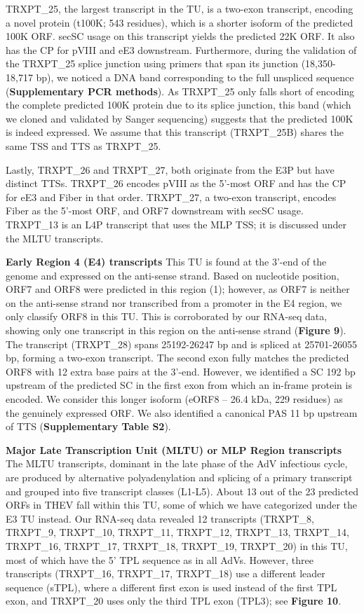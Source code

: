 \documentclass[
]{article}
\begin{document}
TRXPT\_25, the largest transcript in the TU, is a two-exon transcript,
encoding a novel protein (t100K; 543 residues), which is a shorter
isoform of the predicted 100K ORF. secSC usage on this transcript yields
the predicted 22K ORF. It also has the CP for pVIII and eE3 downstream.
Furthermore, during the validation of the TRXPT\_25 splice junction
using primers that span its junction (18,350-18,717 bp), we noticed a
DNA band corresponding to the full unspliced sequence
(\textbf{Supplementary PCR methods}). As TRXPT\_25 only falls short of
encoding the complete predicted 100K protein due to its splice junction,
this band (which we cloned and validated by Sanger sequencing) suggests
that the predicted 100K is indeed expressed. We assume that this
transcript (TRXPT\_25B) shares the same TSS and TTS as TRXPT\_25.

Lastly, TRXPT\_26 and TRXPT\_27, both originate from the E3P but have
distinct TTSs. TRXPT\_26 encodes pVIII as the 5'-most ORF and has the CP
for eE3 and Fiber in that order. TRXPT\_27, a two-exon transcript,
encodes Fiber as the 5'-most ORF, and ORF7 downstream with secSC usage.
TRXPT\_13 is an L4P transcript that uses the MLP TSS; it is discussed
under the MLTU transcripts.

\textbf{Early Region 4 (E4) transcripts} This TU is found at the 3'-end
of the genome and expressed on the anti-sense strand. Based on
nucleotide position, ORF7 and ORF8 were predicted in this region (1);
however, as ORF7 is neither on the anti-sense strand nor transcribed
from a promoter in the E4 region, we only classify ORF8 in this TU. This
is corroborated by our RNA-seq data, showing only one transcript in this
region on the anti-sense strand (\textbf{Figure 9}). The transcript
(TRXPT\_28) spans 25192-26247 bp and is spliced at 25701-26055 bp,
forming a two-exon transcript. The second exon fully matches the
predicted ORF8 with 12 extra base pairs at the 3'-end. However, we
identified a SC 192 bp upstream of the predicted SC in the first exon
from which an in-frame protein is encoded. We consider this longer
isoform (eORF8 -- 26.4 kDa, 229 residues) as the genuinely expressed
ORF. We also identified a canonical PAS 11 bp upstream of TTS
(\textbf{Supplementary Table S2}).

\textbf{Major Late Transcription Unit (MLTU) or MLP Region
transcripts}\\
The MLTU transcripts, dominant in the late phase of the AdV infectious
cycle, are produced by alternative polyadenylation and splicing of a
primary transcript and grouped into five transcript classes (L1-L5).
About 13 out of the 23 predicted ORFs in THEV fall within this TU, some
of which we have categorized under the E3 TU instead. Our RNA-seq data
revealed 12 transcripts (TRXPT\_8, TRXPT\_9, TRXPT\_10, TRXPT\_11,
TRXPT\_12, TRXPT\_13, TRXPT\_14, TRXPT\_16, TRXPT\_17, TRXPT\_18,
TRXPT\_19, TRXPT\_20) in this TU, most of which have the 5' TPL sequence
as in all AdVs. However, three transcripts (TRXPT\_16, TRXPT\_17,
TRXPT\_18) use a different leader sequence (sTPL), where a different
first exon is used instead of the first TPL exon, and TRXPT\_20 uses
only the third TPL exon (TPL3); see \textbf{Figure 10}.
\end{document}
